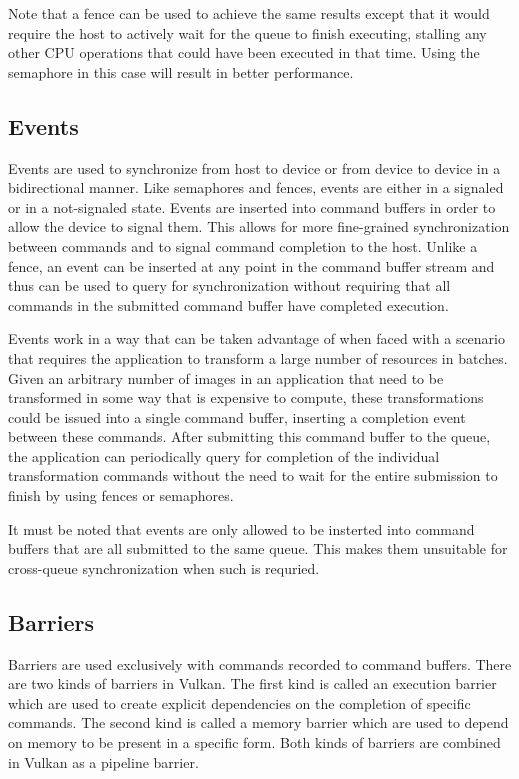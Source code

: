       Note that a fence can be used to achieve the same results except that it would require the \gls{host} to actively wait for the queue to finish executing, stalling any other CPU operations that could have been executed in that time. Using the semaphore in this case will result in better performance.

    \subsection{Events}
    \label{sub:Events}
      Events are used to synchronize from \gls{host} to device or from device to device in a bidirectional manner. Like semaphores and fences, events are either in a signaled or in a not-signaled state. Events are inserted into command buffers in order to allow the device to signal them. This allows for more fine-grained synchronization between commands and to signal command completion to the \gls{host}. Unlike a fence, an event can be inserted at any point in the command buffer stream and thus can be used to query for synchronization without requiring that all commands in the submitted command buffer have completed execution.

      Events work in a way that can be taken advantage of when faced with a scenario that requires the \gls{application} to transform a large number of resources in batches. Given an arbitrary number of images in an \gls{application} that need to be transformed in some way that is expensive to compute, these transformations could be issued into a single command buffer, inserting a completion event between these commands. After submitting this command buffer to the queue, the \gls{application} can periodically query for completion of the individual transformation commands without the need to wait for the entire submission to finish by using fences or semaphores.

      It must be noted that events are only allowed to be insterted into command buffers that are all submitted to the same queue. This makes them unsuitable for cross-queue synchronization when such is requried.

    \subsection{Barriers}
    \label{sub:Barriers}
      Barriers are used exclusively with commands recorded to command buffers. There are two kinds of barriers in Vulkan. The first kind is called an execution barrier which are used to create explicit dependencies on the completion of specific commands. The second kind is called a memory barrier which are used to depend on memory to be present in a specific form. Both kinds of barriers are combined in Vulkan as a pipeline barrier.

